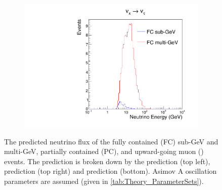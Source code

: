 \begin{figure}[h]
\begin{subfigure}[t]{0.49\textwidth}
    \includegraphics[width=\textwidth, trim={0mm 0mm 0mm 0mm}, clip,page=1]{Figures/Simulations/NeutrinoEnergyDist_NuTau.pdf}
  \end{subfigure}%
  \caption{The predicted neutrino flux of the fully contained (FC) sub-GeV and multi-GeV, partially contained (PC), and upward-going muon () events. The prediction is broken down by the  prediction (top left),  prediction (top right) and  prediction (bottom). Asimov A oscillation parameters are assumed (given in \autoref{tab:Theory_ParameterSets}).}
  \label{fig:Simulations_NeutrinoEnergyDistribution}
\end{figure}

